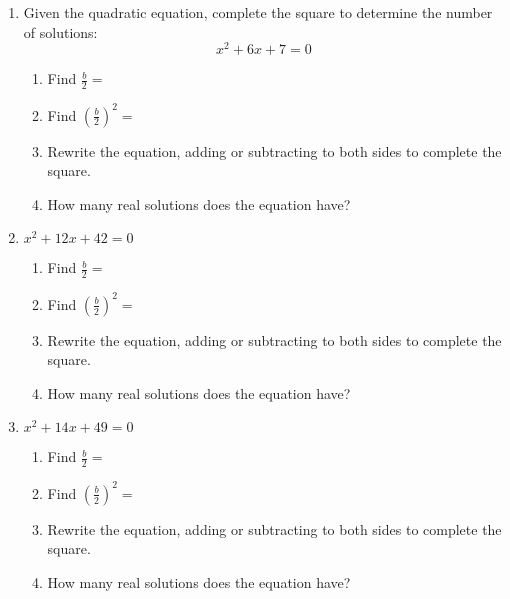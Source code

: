 \documentclass[12pt, twoside]{article}
\begin{document}
\begin{enumerate}
\newpage
\item Given the quadratic equation, complete the square to determine the number of solutions: $$x^2 + 6x + 7 = 0$$
    \begin{enumerate}
        \item Find $\displaystyle \frac{b}{2}=$
        \item Find $\displaystyle \left( \frac{b}{2} \right)^2=$

        \item Rewrite the equation, adding or subtracting to both sides to complete the square. \vspace{1.5cm}
        \item How many real solutions does the equation have? \vspace{0.5cm}
    \end{enumerate}

\item \hspace{5cm} $x^2 + 12x + 42 = 0$
    \begin{enumerate}
        \item Find $\displaystyle \frac{b}{2}=$
        \item Find $\displaystyle \left( \frac{b}{2} \right)^2=$

        \item Rewrite the equation, adding or subtracting to both sides to complete the square. \vspace{1.5cm}
        \item How many real solutions does the equation have? \vspace{0.5cm}
    \end{enumerate}

\item \hspace{5cm} $x^2 + 14x + 49 = 0$
    \begin{enumerate}
        \item Find $\displaystyle \frac{b}{2}=$
        \item Find $\displaystyle \left( \frac{b}{2} \right)^2=$

        \item Rewrite the equation, adding or subtracting to both sides to complete the square. \vspace{1.5cm}
        \item How many real solutions does the equation have? \vspace{0.5cm}
    \end{enumerate}


\end{enumerate}
\end{document}
